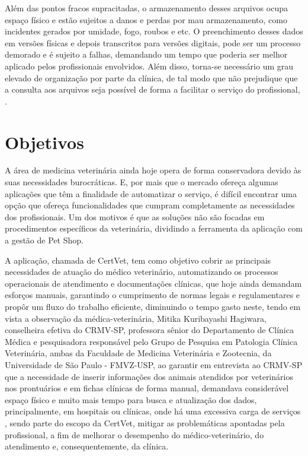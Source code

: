 \documentclass[
    12pt,               %
    openright,          %
    oneside,
    a4paper,            %
    BIBLATEX,           %
    TODO,               %
    english,            %
    brazil              %
    ]{ifsp-spo-inf-ctds}
\begin{document}
    Além das pontos fracos supracitadas, o armazenamento desses arquivos ocupa espaço físico e estão sujeitos a danos e perdas por mau armazenamento, como incidentes gerados por umidade, fogo, roubos e etc. O preenchimento desses dados em versões físicas e depois transcritos para versões digitais, pode ser um processo demorado e é sujeito a falhas, demandando um tempo que poderia ser melhor aplicado pelos profissionais envolvidos. Além disso, torna-se necessário um grau elevado de organização por parte da clínica, de tal modo que não prejudique que a consulta aos arquivos seja possível de forma a facilitar o serviço do profissional, .

    \section{Objetivos} \label{objetivos}

    A área de medicina veterinária ainda hoje opera de forma conservadora devido às suas necessidades burocráticas. E, por mais que o mercado ofereça algumas aplicações que têm a finalidade de automatizar o serviço, é difícil encontrar uma opção que ofereça funcionalidades que cumpram completamente as necessidades dos profissionais. Um dos motivos é que as soluções não são focadas em procedimentos específicos da veterinária, dividindo a ferramenta da aplicação com a gestão de Pet Shop.
    
    A aplicação, chamada de CertVet, tem como objetivo cobrir as principais necessidades de atuação do médico veterinário, automatizando os processos operacionais de atendimento e documentações clínicas, que hoje ainda demandam esforços manuais, garantindo o cumprimento de normas legais e regulamentares e propôr um fluxo do trabalho eficiente, diminuindo o tempo gasto neste, tendo em vista a observação da médica-veterinária, Mitika Kuribayashi Hagiwara, conselheira efetiva do CRMV-SP, professora sênior do Departamento de Clínica Médica e pesquisadora responsável pelo Grupo de Pesquisa em Patologia Clínica Veterinária, ambas da Faculdade de Medicina Veterinária e Zootecnia, da Universidade de São Paulo - FMVZ-USP, ao garantir em entrevista ao CRMV-SP que a necessidade de inserir informações dos animais atendidos por veterinários nos prontuários e em fichas clínicas de forma manual, demandava considerável espaço físico e muito mais tempo para busca e atualização dos dados, principalmente, em hospitais ou clínicas, onde há uma excessiva carga de serviços \cite{mitika}, sendo parte do escopo da CertVet, mitigar as problemáticas apontadas pela profissional, a fim de melhorar o desempenho do médico-veterinário, do atendimento e, consequentemente, da clínica.
\end{document}
